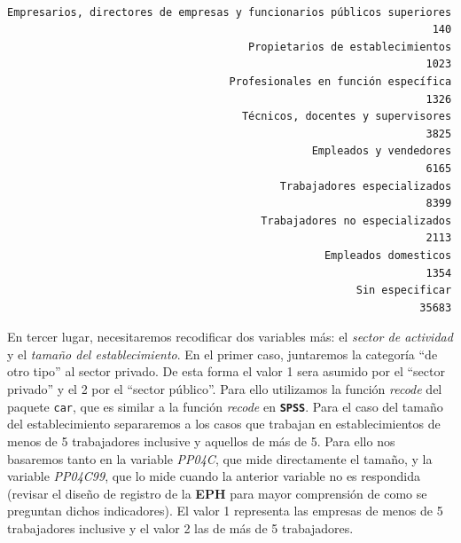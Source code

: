 \documentclass[
]{article}
\begin{document}
\begin{verbatim}

Empresarios, directores de empresas y funcionarios públicos superiores 
                                                                   140 
                                      Propietarios de establecimientos 
                                                                  1023 
                                   Profesionales en función específica 
                                                                  1326 
                                     Técnicos, docentes y supervisores 
                                                                  3825 
                                                Empleados y vendedores 
                                                                  6165 
                                           Trabajadores especializados 
                                                                  8399 
                                        Trabajadores no especializados 
                                                                  2113 
                                                  Empleados domesticos 
                                                                  1354 
                                                       Sin especificar 
                                                                 35683 
\end{verbatim}

En tercer lugar, necesitaremos recodificar dos variables más: el \emph{sector de actividad} y el \emph{tamaño del establecimiento}. En el primer caso, juntaremos la categoría ``de otro tipo'' al sector privado. De esta forma el valor 1 sera asumido por el ``sector privado'' y el 2 por el ``sector público''. Para ello utilizamos la función \emph{recode} del paquete \texttt{car}, que es similar a la función \emph{recode} en \textbf{\texttt{SPSS}}. Para el caso del tamaño del establecimiento separaremos a los casos que trabajan en establecimientos de menos de 5 trabajadores inclusive y aquellos de más de 5. Para ello nos basaremos tanto en la variable \emph{PP04C}, que mide directamente el tamaño, y la variable \emph{PP04C99}, que lo mide cuando la anterior variable no es respondida (revisar el diseño de registro de la \textbf{EPH} para mayor comprensión de como se preguntan dichos indicadores). El valor 1 representa las empresas de menos de 5 trabajadores inclusive y el valor 2 las de más de 5 trabajadores.
\end{document}
